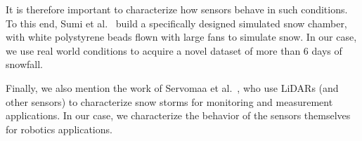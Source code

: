 It is therefore important to characterize how sensors behave in such conditions. To this end, Sumi et al.~\cite{sumi-arso-13} build a specifically designed simulated snow chamber, with white polystyrene beads flown with large fans to simulate snow. In our case, we use real world conditions to acquire a novel dataset of more than 6 days of snowfall.

Finally, we also mention the work of Servomaa et al.~\cite{servomaa2002snowfall}, who use LiDARs (and other sensors) to characterize snow storms for monitoring and measurement applications. In our case, we characterize the behavior of the sensors themselves for robotics applications.







